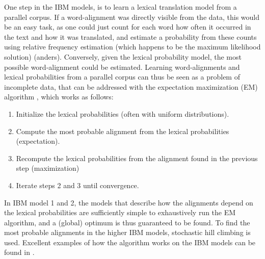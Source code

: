 \documentclass{report}
\theoremstyle{definition}
\theoremstyle{plain}
\begin{document}
One step in the IBM models, is to learn a lexical translation model from a parallel corpus. If a word-alignment was directly visible from the data, this would be an easy task, as one could just count for each word how often it occurred in the text and how it was translated, and estimate a probability from these counts using relative frequency estimation (which happens to be the maximum likelihood solution) (anders). Conversely, given the lexical probability model, the most possible word-alignment could be estimated. Learning word-alignments and lexical probabilities from a parallel corpus can thus be seen as a problem of incomplete data, that can be addressed with the expectation maximization (EM) algorithm \citep{dempster1977maximum}, which works as follows:\begin{enumerate}
\item Initialize the lexical probabilities (often with uniform distributions).
\item Compute the most probable alignment from the lexical probabilities (expectation).
\item Recompute the lexical probabilities from the alignment found in the previous step (maximization)
\item Iterate steps 2 and 3 until convergence.
\end{enumerate}

In IBM model 1 and 2, the models that describe how the alignments depend on the lexical probabilities are sufficiently simple to exhaustively run the EM algorithm, and a (global) optimum is thus guaranteed to be found. To find the most probable alignments in the higher IBM models, stochastic hill climbing is used. Excellent examples of how the algorithm works on the IBM models can be found in \cite[p88-113]{koehn2008statistical}.
\end{document}
